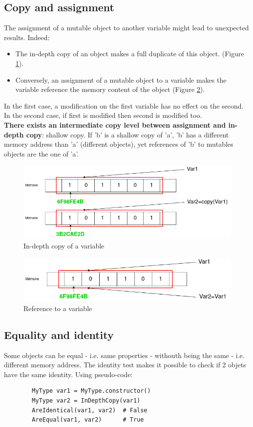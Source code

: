\documentclass[11pt]{article}
\begin{document}
			\subsection{Copy and assignment}
				The assignment of a mutable object to another variable might lead to unexpected results. Indeed:
\begin{itemize}
\item The in-depth copy of an object makes a full duplicate of this object.
				(Figure \ref{fig:copie}). 
\item Conversely, an assignment of a mutable object to a variable makes the variable reference the memory content of the object (Figure \ref{fig:vue}).
    \end{itemize}
				 In the first case, a modification on the first variable has no effect on the second. In the second case, if first is modified then second is modified too.
				 \\
				 \textbf{There exists an intermediate copy level between assignment and in-depth copy}: shallow copy. If 'b' is a shallow copy of 'a', 'b' has a different memory address than 'a' (different objects), yet references of 'b' to mutables objects are the one of 'a'. 

				\begin{figure}[h!]
					\centering
					\includegraphics[width=15cm]{figures/Mutabilite/Mutabilite - copie.drawio}
					\caption{In-depth copy of a variable}
					\label{fig:copie}
				\end{figure}
				\begin{figure}[h!]
					\centering
					\includegraphics[width=15cm]{figures/Mutabilite/Mutabilite - vue.drawio}
					\caption{Reference to a variable}
					\label{fig:vue}
				\end{figure}

			\subsection{Equality and identity}
				Some objects can be equal - i.e. same properties - withouth being the same - i.e. different memory address. 
            The identity test makes it possible to check if 2 objets have the same identity. Using pseudo-code:

	\begin{verbatim}
		MyType var1 = MyType.constructor()
		MyType var2 = InDepthCopy(var1)
		AreIdentical(var1, var2)  # False
		AreEqual(var1, var2)  	  # True
				\end{verbatim}
\end{document}
